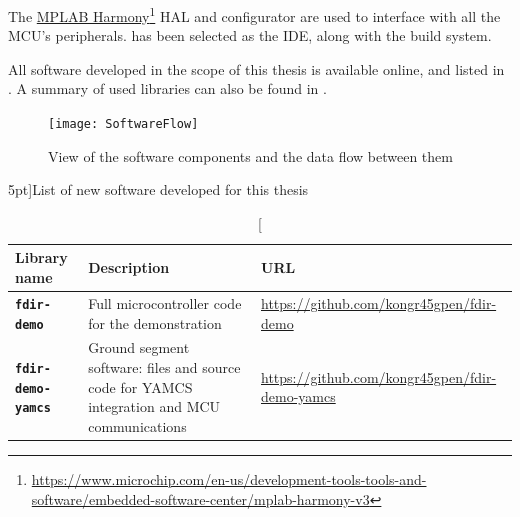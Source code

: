 \documentclass[a4paper,nobib,final]{tufte-book}
\begin{document}
The \href{https://www.microchip.com/en-us/development-tools-tools-and-software/embedded-software-center/mplab-harmony-v3}{MPLAB Harmony}\footnote[][1.5cm]{\url{https://www.microchip.com/en-us/development-tools-tools-and-software/embedded-software-center/mplab-harmony-v3}} \ac{HAL} and configurator are used to interface with all the \acs{MCU}'s peripherals.  has been selected as the \acs{IDE}, along with the  build system.

All software developed in the scope of this thesis is available online, and listed in . A summary of used libraries can also be found in .

\begin{figure}[h]
	\vspace{1cm}
	\texttt{[image: SoftwareFlow]}
	\caption{View of the software components and the data flow between them}
	\label{sec:softwareflow}
\end{figure}

\FloatBarrier
\begin{table}[h]
	\centering
	\caption[][5pt]{List of new software developed for this thesis}
	\renewcommand{\arraystretch}{1.2}
	\label{tab:new_software}
	\begin{tabularx}{\textwidth}{@{}lXp{6cm}@{}}
		\toprule
		Library name & Description & URL \\ \midrule
		\textbf{\texttt{fdir-demo}} & Full microcontroller code for the demonstration & \small \url{https://github.com/kongr45gpen/fdir-demo} \\
		\textbf{\texttt{fdir-demo-yamcs}} & Ground segment software: files and source code for \acs{YAMCS} integration and \acs{MCU} communications & \small \url{https://github.com/kongr45gpen/fdir-demo-yamcs} \\
		\bottomrule
	\end{tabularx}
\end{table}
\end{document}
